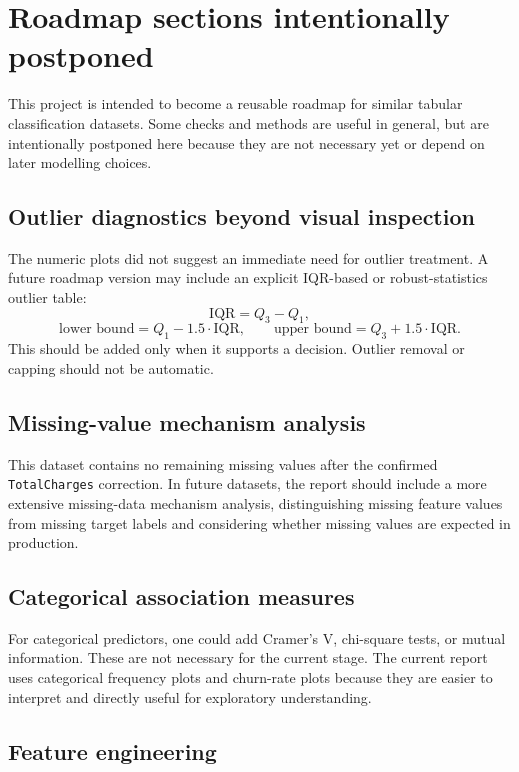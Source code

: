 \section{Roadmap sections intentionally postponed}

This project is intended to become a reusable roadmap for similar tabular classification datasets. Some checks and methods are useful in general, but are intentionally postponed here because they are not necessary yet or depend on later modelling choices.

\subsection{Outlier diagnostics beyond visual inspection}

The numeric plots did not suggest an immediate need for outlier treatment. A future roadmap version may include an explicit IQR-based or robust-statistics outlier table:
\[
\text{IQR} = Q_3 - Q_1,
\]
\[
\text{lower bound} = Q_1 - 1.5 \cdot \text{IQR},
\qquad
\text{upper bound} = Q_3 + 1.5 \cdot \text{IQR}.
\]
This should be added only when it supports a decision. Outlier removal or capping should not be automatic.

\subsection{Missing-value mechanism analysis}

This dataset contains no remaining missing values after the confirmed \texttt{TotalCharges} correction. In future datasets, the report should include a more extensive missing-data mechanism analysis, distinguishing missing feature values from missing target labels and considering whether missing values are expected in production.

\subsection{Categorical association measures}

For categorical predictors, one could add Cramer's V, chi-square tests, or mutual information. These are not necessary for the current stage. The current report uses categorical frequency plots and churn-rate plots because they are easier to interpret and directly useful for exploratory understanding.

\subsection{Feature engineering}

